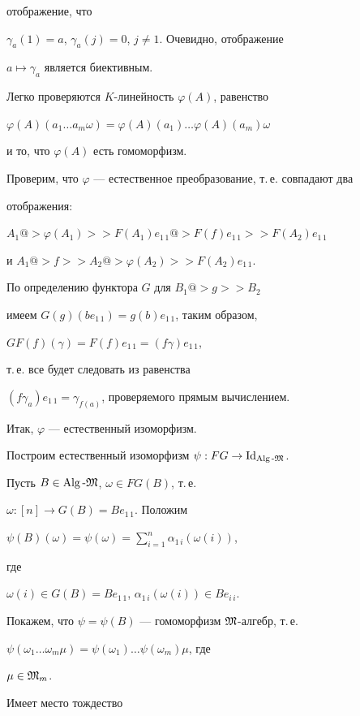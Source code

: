 \begin{pf}
отображение, что


$\gamma_a(1)=a$, $\gamma_a(j)=0$, $j\neq 1$. Очевидно, отображение


$a\mapsto \gamma_a$ является биективным.


Легко проверяются $K$-линейность $\varphi(A)$, равенство


$\varphi (A)(a_1\dotsc a_m\omega)=


\varphi (A)(a_1)\dotsc \varphi (A)(a_m)\omega$


и то, что $\varphi (A)$ есть гомоморфизм.


Проверим, что $\varphi$ --- естественное преобразование, т.\,е. совпадают два


отображения:


$A_1 @>{\varphi (A_1)}>> F(A_1)e_{1\,1}@>{F(f) e_{1\, 1}}>> F(A_2)e_{1\,1}$


и $A_1@>f>>A_2 @>{\varphi (A_2)}>> F(A_2)e_{1\,1}$.


По определению функтора $G$ для $B_1@>g>> B_2$


имеем $G(g)(be_{1\,1})=g(b)e_{1\,1}$, таким образом,


$GF(f)(\gamma)=F(f)e_{1\,1}=(f\gamma)e_{1\,1}$,


т.\,е. все будет следовать из равенства


$(f\gamma_a)e_{1\,1}=\gamma_{f(a)}$, проверяемого прямым вычислением.


Итак, $\varphi$ --- естественный изоморфизм.





Построим естественный изоморфизм $\psi: FG\to \operatorname{Id}_{\operatorname{Alg}\text{-}\frak M}$.


Пусть $B\in \operatorname{Alg}\text{-}\frak M$, $\omega\in FG(B)$, т.\,е.


$\omega : [n]\to G(B)=Be_{1\,1}$. Положим


$\psi(B)(\omega)=\psi(\omega)=\sum\limits_{i=1}^n\alpha_{1\,i}(\omega(i))$,


где


$\omega (i)\in G(B)=Be_{1\,1}$, $\alpha_{1\,i}(\omega (i))\in Be_{i\,i}$.


Покажем, что $\psi=\psi(B)$ --- гомоморфизм $\frak M$-алгебр, т.\,е.


$\psi(\omega_1\dotsc \omega_m\mu)=


\psi (\omega_1)\dotsc \psi (\omega_m)\mu$, где


$\mu\in \frak M_m$.


Имеет место тождество



\end{pf}
